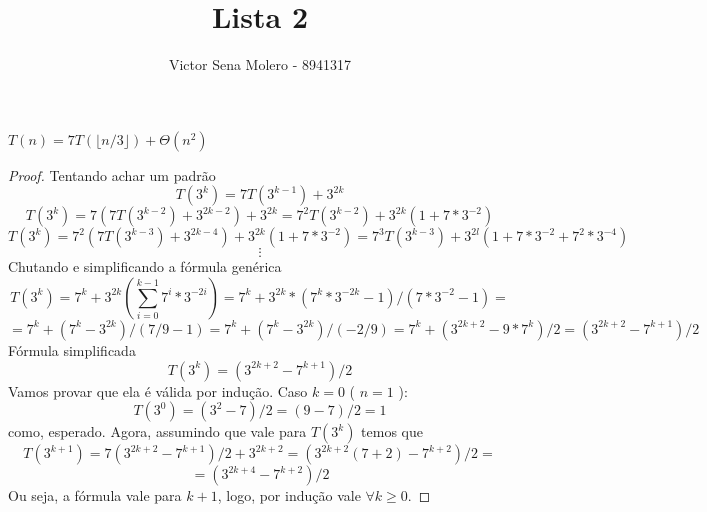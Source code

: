\documentclass[12pt]{article}
\newenvironment{problem}[2][Ex]{\begin{trivlist}
\item[\hskip \labelsep {\bfseries #1}\hskip \labelsep {\bfseries #2.}]}{\end{trivlist}}
\begin{document}
 
 
\title{Lista 2}
\author{Victor Sena Molero - 8941317}
\maketitle
 
\begin{problem}{1.d}
$T(n) = 7T(\lfloor n/3 \rfloor) + \Theta(n^2)$
\end{problem}
 
\begin{proof}
Tentando achar um padrão
$$ T(3^k) = 7T(3^{k-1}) + 3^{2k} $$
$$ T(3^k) = 7(7T(3^{k-2})+3^{2k-2}) + 3^{2k} = 7^2T(3^{k-2}) + 3^{2k}(1+7*3^{-2}) $$
$$ T(3^k) = 7^2(7T(3^{k-3})+3^{2k-4}) + 3^{2k}(1+7*3^{-2}) = 7^3T(3^{k-3}) + 3^{2l}(1+7*3^{-2}+7^2*3^{-4}) $$
$$ \vdots $$
Chutando e simplificando a fórmula genérica
$$ T(3^k) = 7^k + 3^{2k}(\sum_{i=0}^{k-1} 7^i*3^{-2i}) = 7^k + 3^{2k}*(7^k*3^{-2k}-1)/(7*3^{-2} - 1) = $$
$$ = 7^k+(7^k-3^{2k})/(7/9-1) = 7^k+(7^k-3^{2k})/(-2/9) = 7^k + (3^{2k+2} - 9*7^k)/2 = (3^{2k+2} - 7^{k+1})/2 $$
Fórmula simplificada
$$ T(3^k) = (3^{2k+2} - 7^{k+1})/2 $$
Vamos provar que ela é válida por indução. Caso $ k = 0 $ ( $ n = 1 $ ):
$$ T(3^0) = (3^{2}-7)/2 = (9-7)/2 = 1 $$
como, esperado. Agora, assumindo que vale para $ T(3^k) $ temos que
$$ T(3^{k+1}) = 7(3^{2k+2} - 7^{k+1})/2 + 3^{2k+2} = (3^{2k+2}(7+2) - 7^{k+2})/2 = $$
$$ = (3^{2k+4} - 7^{k+2})/2 $$
Ou seja, a fórmula vale para $ k+1 $, logo, por indução vale $ \forall k \geq 0 $.
\end{proof}
\end{document}
